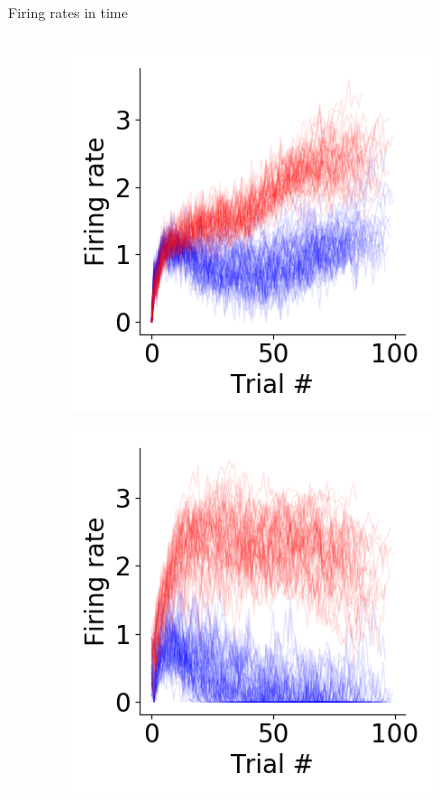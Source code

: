 \documentclass[14pt]{beamer}
\begin{document}
\begin{frame}{Firing rates in time}
\begin{columns}
\begin{column}{0.3\textwidth}
\end{column}
\begin{column}{0.3\textwidth}

  \begin{figure}
  \includegraphics[width=0.9\textwidth]{images/ptask/timecourse-42}
  \end{figure}
  \vspace{-1cm}
  \begin{figure}
    \includegraphics[width=0.9\textwidth]{images/ptask/timecourse-17}
  \end{figure}


\end{column}
\end{columns}
\end{frame}
\end{document}

